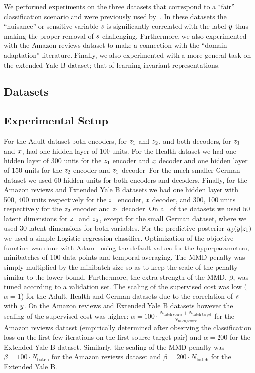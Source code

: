 We performed experiments on the three datasets that correspond to a ``fair'' classification scenario and were previously used by~\cite{zemel2013learning}. In these datasets the ``nuisance'' or sensitive variable $\*s$ is significantly correlated with the label $\*y$ thus making the proper removal of $\*s$ challenging. Furthermore, we also experimented with the Amazon reviews dataset to make a connection with the ``domain-adaptation'' literature. Finally, we also experimented with a more general task on the extended Yale B dataset; that of learning invariant representations. 

\subsection{Datasets}

\subsection{Experimental Setup}
For the Adult dataset both encoders, for $\*z_1$ and $\*z_2$, and both decoders, for $\*z_1$ and $\*x$, had one hidden layer of 100 units. For the Health dataset we had one hidden layer of 300 units for the $\*z_1$ encoder and $\*x$ decoder and one hidden layer of 150 units for the $\*z_2$ encoder and $\*z_1$ decoder. For the much smaller German dataset we used 60 hidden units for both encoders and decoders. Finally, for the Amazon reviews and Extended Yale B datasets we had one hidden layer with 500, 400 units respectively for the $\*z_1$ encoder, $\*x$ decoder, and 300, 100 units respectively for the $\*z_2$ encoder and $\*z_1$ decoder. On all of the datasets we used 50 latent dimensions for $\*z_1$ and $\*z_2$, except for the small German dataset, where we used 30 latent dimensions for both variables. For the predictive posterior $q_\phi(\*y|\*z_1)$ we used a simple Logistic regression classifier. Optimization of the objective function was done with Adam~\citep{DBLP:journals/corr/KingmaB14} using the default values for the hyperparameters, minibatches of 100 data points and temporal averaging. The MMD penalty was simply multiplied by the minibatch size so as to keep the scale of the penalty similar to the lower bound. Furthermore, the extra strength of the MMD, $\beta$, was tuned according to a validation set. The scaling of the supervised cost was low ($\alpha = 1 $) for the Adult, Health and German datasets due to the correlation of $\*s$ with $\*y$. On the Amazon reviews and Extended Yale B datasets however the scaling of the supervised cost was higher: $\alpha = 100 \cdot \frac{N_{\text{batch\_source}} + N_{\text{batch\_target}}}{N_{\text{batch\_source}}}$ for the Amazon reviews dataset (empirically determined after observing the classification loss on the first few iterations on the first source-target pair) and $\alpha = 200$ for the Extended Yale B dataset. Similarly, the scaling of the MMD penalty was $\beta = 100 \cdot N_{\text{batch}}$ for the Amazon reviews dataset and $\beta = 200 \cdot N_{\text{batch}}$ for the Extended Yale B.

